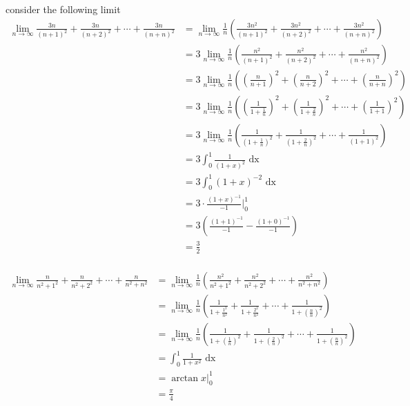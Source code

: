 \documentclass[a4paper,12pt]{article}
\newcommand{\?}{\stackrel{?}{=}}
\begin{document}
\begin{my_example}
consider the following limit\\[0pt]
\begin{align*}
  \lim_{n\to\infty} \frac{3n}{(n+1)^2} + \frac{3n}{(n+2)^2} + \cdots + \frac{3n}{(n+n)^2} &= \lim_{n\to\infty} \frac1n \left(\frac{3n^2}{(n+1)^2} + \frac{3n^2}{(n+2)^2} + \cdots + \frac{3n^2}{(n+n)^2}\right)\\
  &= 3\lim_{n\to\infty} \frac1n \left(\frac{n^2}{(n+1)^2} + \frac{n^2}{(n+2)^2} + \cdots + \frac{n^2}{(n+n)^2}\right)\\
  &= 3\lim_{n\to\infty} \frac1n \left(\left(\frac{n}{n+1}\right)^2 + \left(\frac{n}{n+2}\right)^2 + \cdots + \left(\frac{n}{n+n}\right)^2\right)\\
  &= 3\lim_{n\to\infty} \frac1n \left(\left(\frac{1}{1+\frac1n}\right)^2 + \left(\frac{1}{1+\frac2n}\right)^2 + \cdots + \left(\frac{1}{1+1}\right)^2\right)\\
  &= 3\lim_{n\to\infty} \frac1n \left(\frac{1}{\left(1+\frac1n\right)^2} + \frac{1}{\left(1+\frac2n\right)^2} + \cdots + \frac{1}{{(1+1)}^2}\right)\\
  &= 3\int_{0}^{1} \frac{1}{{(1+x)}^2} \text{ dx}\\
  &= 3\int_{0}^{1} {(1+x)}^{-2} \text{ dx}\\
  &= 3 \cdot \frac{{(1+x)}^{-1}}{-1} \Bigg|_{0}^{1}\\
  &= 3\left(\frac{{(1+1)}^{-1}}{-1} - \frac{{(1+0)}^{-1}}{-1}\right)\\
  &= \frac{3}{2}\\
\end{align*}
\end{my_example}
\begin{my_example}
\begin{align*}
  \lim_{n\to\infty} \frac{n}{n^2+1^2} + \frac{n}{n^2+2^2} + \cdots + \frac{n}{n^2+n^2} &= \lim_{n\to\infty} \frac1n\left(\frac{n^2}{n^2+1^2} + \frac{n^2}{n^2+2^2} + \cdots + \frac{n^2}{n^2+n^2}\right)\\
  &= \lim_{n\to\infty} \frac1n\left(\frac{1}{1+\frac{1^2}{n^2}} + \frac{1}{1+\frac{2^2}{n^2}} + \cdots + \frac{1}{1 + \left(\frac{n}{n}\right)^2}\right)\\
  &= \lim_{n\to\infty} \frac1n\left(\frac{1}{1+\left(\frac{1}{n}\right)^2} + \frac{1}{1+\left(\frac{2}{n}\right)^2} + \cdots + \frac{1}{1 + \left(\frac{n}{n}\right)^2}\right)\\
  &= \int_{0}^{1} \frac{1}{1+x^2} \text{ dx}\\
  &= \arctan x \Big|_{0}^{1}\\
  &= \frac{\pi}{4}
\end{align*}
\end{my_example}
\end{document}
